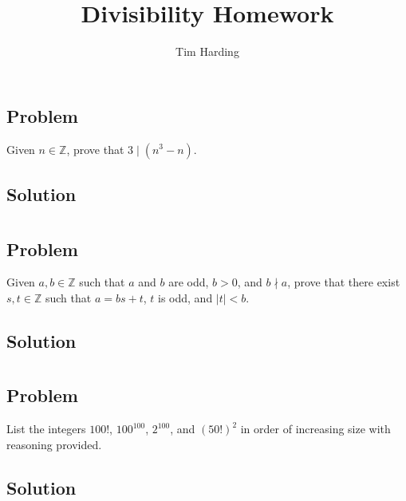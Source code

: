 \documentclass[12pt]{article}
\title{Divisibility Homework}
\author{Tim Harding}
\newcommand{\abs}  [1]{\left|       #1 \right|      }
\newcommand{\Z}    [0]{\mathbb{Z}                   }
\begin{document}
\maketitle

\section{}

\subsection{Problem}
Given $n \in \mathbb{Z}$, prove that $3 \mid (n^3 - n)$.

\subsection{Solution}



\section{}

\subsection{Problem}
Given $a, b \in \Z$ such that $a$ and $b$ are odd, $b > 0$, and $b \nmid a$, prove that there exist $s, t \in \Z$ such that $a = bs + t$, $t$ is odd, and $\abs{t} < b$.

\subsection{Solution}



\section{}

\subsection{Problem}
List the integers $100!$, $100^100$, $2^100$, and $(50!)^2$ in order of increasing size with reasoning provided.

\subsection{Solution}
\end{document}
